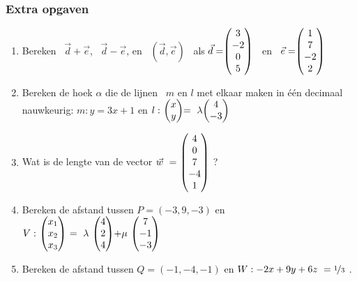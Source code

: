 \subsubsection{Extra opgaven}
\begin{enumerate}
	\item Bereken 
	\ $ \vec{d} + \vec{e} $, \ $ \vec{d} - \vec{e} $, en \ $  (\vec{d} , \vec{e}) $ \ als 
	\quad $ \vec{d} = \vecvier{3}{-2}{0}{5}  $ \  en \  $  \vec{e} =  \vecvier{1}{7}{-2}{2} $ 	
	
	\item  Bereken de hoek $\alpha$ die de  lijnen \ $  m $ en $ l $ met elkaar maken in één decimaal nauwkeurig:
	$ m:  y = 3x + 1  $ en $ l: \  \vectwee{x}{y} = \  \lambda \vectwee{4}{-3}  $
	
	\item Wat is de lengte van de vector $  \vec{w} \ = \ \vecvijf{4}{0}{7}{-4}{1} $ ?
	
	\item Bereken de afstand tussen  $  P = (-3,9,-3)  $ en 
	$ V: \ \vecdriesnel{x} \ =  \ \lambda \ \vecdrie{4}{2}{4} + \mu \  \vecdrie{7}{-1}{-3} $	
	
	\item   Bereken de afstand tussen  $  Q = (-1,-4,-1)  $ en 
	$ W: -2x + 9y + 6z \ = \nicefrac{1}{3} $ .
\end{enumerate}

